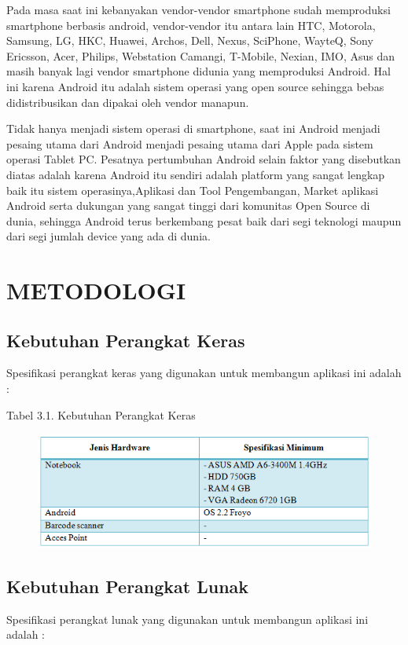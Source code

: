 \documentclass{jtetiproposalskripsi}
\begin{document}
Pada masa saat ini kebanyakan vendor-vendor smartphone sudah memproduksi smartphone berbasis android, vendor-vendor itu antara lain HTC, Motorola, Samsung, LG, HKC, Huawei, Archos, Dell, Nexus, SciPhone, WayteQ, Sony Ericsson, Acer, Philips, Webstation Camangi, T-Mobile, Nexian, IMO, Asus dan masih banyak lagi vendor smartphone didunia yang memproduksi Android. Hal ini karena Android itu adalah sistem operasi yang open source sehingga bebas didistribusikan dan dipakai oleh vendor manapun.

Tidak hanya menjadi sistem operasi di smartphone, saat ini Android menjadi pesaing utama dari Android menjadi pesaing utama dari Apple pada sistem operasi Tablet PC. Pesatnya pertumbuhan Android selain faktor yang disebutkan diatas adalah karena Android itu sendiri adalah platform yang sangat lengkap baik itu sistem operasinya,Aplikasi dan Tool Pengembangan, Market aplikasi Android serta dukungan yang sangat tinggi dari komunitas Open Source di dunia, sehingga Android terus berkembang pesat baik dari segi teknologi maupun dari segi jumlah device yang ada di dunia.

\chapter{METODOLOGI}

\section{Kebutuhan Perangkat Keras}
Spesifikasi perangkat keras yang digunakan untuk membangun aplikasi ini adalah : 

\begin{center}
Tabel 3.1. Kebutuhan Perangkat Keras
\end{center}
\vspace{-0.5cm}
\begin{figure}[ht!]
  \centering
    \includegraphics{gambar/hardware}
    \label{hardware}
\end{figure}

\section{Kebutuhan Perangkat Lunak}
Spesifikasi perangkat lunak yang digunakan untuk membangun aplikasi ini adalah : 
\end{document}
